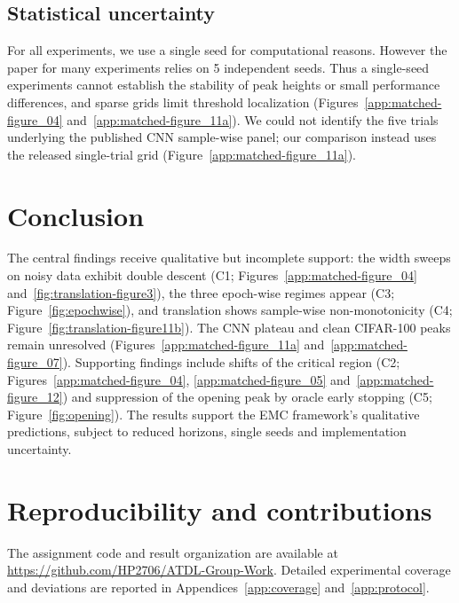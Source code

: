 \documentclass{article}
\begin{document}
\subsection{Statistical uncertainty}

For all experiments, we use a single seed for computational reasons. However the paper for many experiments relies on 5 independent seeds.  Thus a single-seed experiments cannot establish the stability of peak heights or
small performance differences, and sparse grids limit threshold
localization (Figures~\ref{app:matched-figure_04}
and~\ref{app:matched-figure_11a}). We could not identify the five trials
underlying the published CNN sample-wise panel; our comparison instead
uses the released single-trial grid (Figure~\ref{app:matched-figure_11a}). 

\section{Conclusion}
The central findings receive qualitative but incomplete support: the
width sweeps on noisy data exhibit double descent (C1; Figures~\ref{app:matched-figure_04}
and~\ref{fig:translation-figure3}), the three epoch-wise regimes appear
(C3; Figure~\ref{fig:epochwise}), and translation shows sample-wise
non-monotonicity (C4; Figure~\ref{fig:translation-figure11b}). The CNN
plateau and clean CIFAR-100 peaks remain unresolved
(Figures~\ref{app:matched-figure_11a} and~\ref{app:matched-figure_07}).
Supporting findings include shifts of the critical region (C2;
Figures~\ref{app:matched-figure_04}, \ref{app:matched-figure_05}
and~\ref{app:matched-figure_12}) and suppression of the opening peak by
oracle early stopping (C5; Figure~\ref{fig:opening}). The results support
the EMC framework's qualitative predictions, subject to reduced horizons,
single seeds and implementation uncertainty.

\clearpage


\clearpage
\onecolumn
\appendix
\section{Reproducibility and contributions}\label{app:contributions}
The assignment code and result organization are available at
\url{https://github.com/HP2706/ATDL-Group-Work}.
Detailed experimental coverage and deviations are reported in
Appendices~\ref{app:coverage} and~\ref{app:protocol}.
\end{document}
